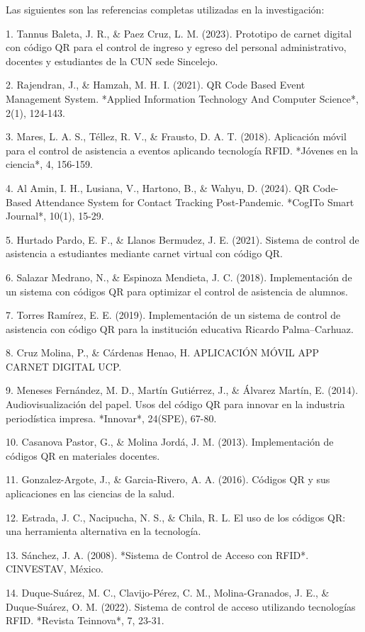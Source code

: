 Las siguientes son las referencias completas utilizadas en la investigación:

1. Tannus Baleta, J. R., \& Paez Cruz, L. M. (2023). Prototipo de carnet digital con código QR para el control de ingreso y egreso del personal administrativo, docentes y estudiantes de la CUN sede Sincelejo.

2. Rajendran, J., \& Hamzah, M. H. I. (2021). QR Code Based Event Management System. *Applied Information Technology And Computer Science*, 2(1), 124-143.

3. Mares, L. A. S., Téllez, R. V., \& Frausto, D. A. T. (2018). Aplicación móvil para el control de asistencia a eventos aplicando tecnología RFID. *Jóvenes en la ciencia*, 4, 156-159.

4. Al Amin, I. H., Lusiana, V., Hartono, B., \& Wahyu, D. (2024). QR Code-Based Attendance System for Contact Tracking Post-Pandemic. *CogITo Smart Journal*, 10(1), 15-29.

5. Hurtado Pardo, E. F., \& Llanos Bermudez, J. E. (2021). Sistema de control de asistencia a estudiantes mediante carnet virtual con código QR.

6. Salazar Medrano, N., \& Espinoza Mendieta, J. C. (2018). Implementación de un sistema con códigos QR para optimizar el control de asistencia de alumnos.

7. Torres Ramírez, E. E. (2019). Implementación de un sistema de control de asistencia con código QR para la institución educativa Ricardo Palma–Carhuaz.

8. Cruz Molina, P., \& Cárdenas Henao, H. APLICACIÓN MÓVIL APP CARNET DIGITAL UCP.

9. Meneses Fernández, M. D., Martín Gutiérrez, J., \& Álvarez Martín, E. (2014). Audiovisualización del papel. Usos del código QR para innovar en la industria periodística impresa. *Innovar*, 24(SPE), 67-80.

10. Casanova Pastor, G., \& Molina Jordá, J. M. (2013). Implementación de códigos QR en materiales docentes.

11. Gonzalez-Argote, J., \& Garcia-Rivero, A. A. (2016). Códigos QR y sus aplicaciones en las ciencias de la salud.

12. Estrada, J. C., Nacipucha, N. S., \& Chila, R. L. El uso de los códigos QR: una herramienta alternativa en la tecnología.

13. Sánchez, J. A. (2008). *Sistema de Control de Acceso con RFID*. CINVESTAV, México.

14. Duque-Suárez, M. C., Clavijo-Pérez, C. M., Molina-Granados, J. E., \& Duque-Suárez, O. M. (2022). Sistema de control de acceso utilizando tecnologías RFID. *Revista Teinnova*, 7, 23-31.

